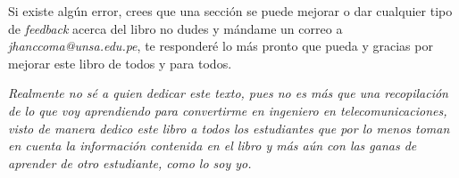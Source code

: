 \documentclass[
	12pt, %
	fleqn, %
	a4paper, %
	oneside, %
]{LegrandOrangeBook}
\begin{document}
\noindent Si existe algún error, crees que una sección se puede mejorar o dar cualquier tipo de \textit{feedback} acerca del libro no dudes y mándame un correo a \textit{jhanccoma@unsa.edu.pe}, te responderé lo más pronto que pueda y gracias por mejorar este libro de todos y para todos.
\clearpage
\begin{center}
    \thispagestyle{empty}
    \vspace*{\fill}
    \textit{Realmente no sé a quien dedicar este texto, pues no es más que una recopilación de lo que voy aprendiendo para convertirme en ingeniero en telecomunicaciones, visto de manera dedico este libro a todos los estudiantes que por lo menos toman en cuenta la información contenida en el libro y más aún con las ganas de aprender de otro estudiante, como lo soy yo.}
    \vspace*{\fill}
\end{center}
\clearpage



\pagestyle{empty} %

\tableofcontents %

\cleardoublepage %

\pagestyle{fancy} %
\end{document}
